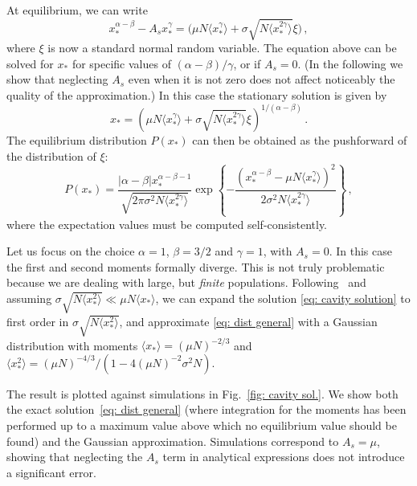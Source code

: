 At equilibrium, we can write
\begin{equation}
    x_*^{\alpha-\beta} - A_s x_*^{\gamma}= \big( \mu N \langle x_*^{\gamma}\rangle + \sigma \sqrt{N\langle x_*^{2\gamma}\rangle}\xi\big) \, ,
\end{equation} 
where $\xi$ is now a standard normal random variable.
The equation above can be solved for $x_*$ for specific values of
$(\alpha-\beta)/\gamma$, or if $A_s=0$.
(In the following we show that neglecting $A_s$ even when it is not zero does not affect noticeably the quality of the approximation.) In this case the stationary solution is given by 
\begin{equation} \label{eq: cavity solution}
    x_* = \left( \mu N \langle x_*^{\gamma}\rangle + \sigma \sqrt{N\langle x_*^{2\gamma}\rangle}\xi\right)^{1/(\alpha-\beta)} \, .
\end{equation}
The equilibrium distribution $P(x_*)$ can then be obtained as the pushforward of the distribution of $\xi$: 
\begin{equation}\label{eq: dist general}
    P(x_*)=\frac{|\alpha-\beta|x_*^{\alpha-\beta-1}}{\sqrt{2\pi\sigma^2 N\langle x_*^{2\gamma}\rangle}}
    \exp{\left\{-\frac{(x_*^{\alpha-\beta}-\mu N\langle x_*^{\gamma}\rangle)^2}{2\sigma^2N\langle x_*^{2\gamma}\rangle}\right\}} \, ,
\end{equation}
where the expectation values must be computed self-consistently.

Let us focus on the choice 
$\alpha=1$, $\beta=3/2$ and $\gamma=1$, with
$A_s=0$. 
In this case the first and second moments formally diverge.
This is not truly problematic because we are dealing with large, but \emph{finite} populations.
Following~\cite{Cui2020,Hatton2023} and assuming
$\sigma \sqrt{N\langle x_*^2\rangle}\ll \mu N \langle x_* \rangle$,
we can expand the  
solution \eqref{eq: cavity solution} to first order in 
$\sigma \sqrt{N\langle x_*^2\rangle}$, and 
approximate \eqref{eq: dist general} with
a Gaussian distribution with moments $\langle x_*\rangle=(\mu N)^{-2/3}$ and $\langle x_*^2\rangle=(\mu N)^{-4/3}/(1-4(\mu N)^{-2}\sigma^2N)$. 

The result is plotted against simulations in 
Fig.~\ref{fig: cavity sol.}. We show both the exact 
solution~\eqref{eq: dist general} 
(where integration for the moments has been performed up to a maximum
value above which no equilibrium value should 
be found) and the Gaussian approximation.
Simulations correspond to $A_s=\mu$, showing that neglecting the $A_s$ term in analytical expressions does not introduce a significant error. 


